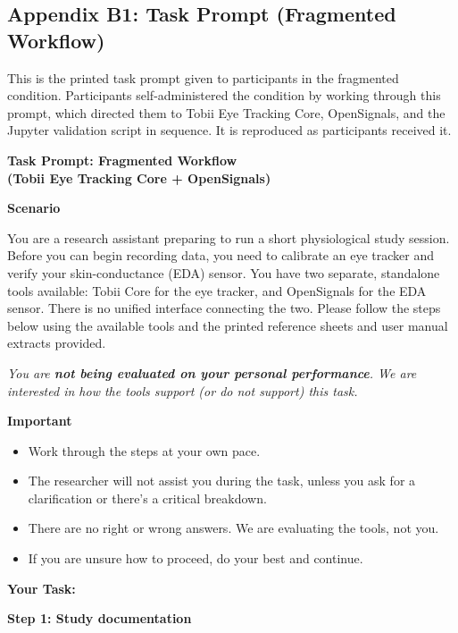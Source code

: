 \documentclass[
]{article}
\begin{document}
\vspace{1.5em}


\clearpage
\clearpage
\hypertarget{appendix-a1-task-prompt-fragmented-workflow}{%
\subsection{Appendix B1: Task Prompt (Fragmented Workflow)}\label{appendix-a1-task-prompt-fragmented-workflow}}

This is the printed task prompt given to participants in the fragmented condition. Participants self-administered the condition by working through this prompt, which directed them to Tobii Eye Tracking Core, OpenSignals, and the Jupyter validation script in sequence. It is reproduced as participants received it.

\textbf{Task Prompt: Fragmented Workflow\\
(Tobii Eye Tracking Core + OpenSignals)}

\textbf{Scenario}

You are a research assistant preparing to run a short physiological study session. Before you can begin recording data, you need to calibrate an eye tracker and verify your skin-conductance (EDA) sensor. You have two separate, standalone tools available: Tobii Core for the eye tracker, and OpenSignals for the EDA sensor. There is no unified interface connecting the two. Please follow the steps below using the available tools and the printed reference sheets and user manual extracts provided.

\emph{You are \textbf{not being evaluated on your personal performance}. We are interested in how the tools support (or do not support) this task.}

\textbf{Important}

\begin{itemize}
\item
  Work through the steps at your own pace.
\item
  The researcher will not assist you during the task, unless you ask for a clarification or there's a critical breakdown.
\item
  There are no right or wrong answers. We are evaluating the tools, not you.
\item
  If you are unsure how to proceed, do your best and continue.
\end{itemize}

\textbf{Your Task:}

\textbf{Step 1: Study documentation}
\end{document}
